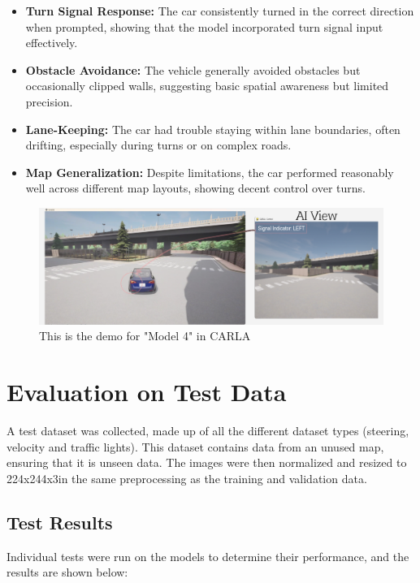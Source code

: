 \documentclass{article} %
\begin{document}
\begin{itemize}
    \item \textbf{Turn Signal Response:} The car consistently turned in the correct direction when prompted, showing that the model incorporated turn signal input effectively.

    \item \textbf{Obstacle Avoidance:} The vehicle generally avoided obstacles but occasionally clipped walls, suggesting basic spatial awareness but limited precision.

    \item \textbf{Lane-Keeping:} The car had trouble staying within lane boundaries, often drifting, especially during turns or on complex roads.

    \item \textbf{Map Generalization:} Despite limitations, the car performed reasonably well across different map layouts, showing decent control over turns.
\end{itemize}


\begin{figure}[H] %
    \centering
    \includegraphics[width=1.0\textwidth]{model4demo.png} %
    \caption{This is the demo for "Model 4" in CARLA}
    \label{fig:model4demo}
\end{figure}


\section{Evaluation on Test Data}
A test dataset was collected, made up of all the different dataset types (steering, velocity and traffic lights). 
This dataset contains data from an unused map, ensuring that it is unseen data.
The images were then normalized and resized to 224x244x3in the same preprocessing as the training and validation data.

\subsection{Test Results}
Individual tests were run on the models to determine their performance, and the results are shown below:
\end{document}
